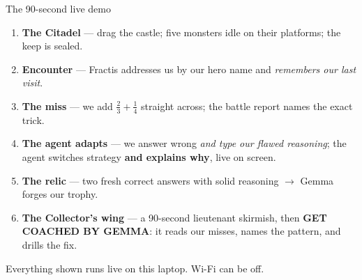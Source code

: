 \documentclass[aspectratio=169,11pt]{beamer}
\newcommand{\mutedtext}[1]{{\color{muted}#1}}
\begin{document}
\begin{frame}{The 90-second live demo}
  \begin{enumerate}\setlength\itemsep{0.4em}
    \item {\small \textbf{The Citadel} --- drag the castle; five monsters idle on their platforms; the keep is sealed.}
    \item {\small \textbf{Encounter} --- Fractis addresses us by our hero name and \emph{remembers our last visit}.}
    \item {\small \textbf{The miss} --- we add $\tfrac{2}{3}+\tfrac{1}{4}$ straight across; the battle report names the exact trick.}
    \item {\small \textbf{The agent adapts} --- we answer wrong \emph{and type our flawed reasoning}; the agent switches strategy \textbf{and explains why}, live on screen.}
    \item {\small \textbf{The relic} --- two fresh correct answers with solid reasoning $\rightarrow$ Gemma forges our trophy.}
    \item {\small \textbf{The Collector's wing} --- a 90-second lieutenant skirmish, then \textbf{GET COACHED BY GEMMA}: it reads our misses, names the pattern, and drills the fix.}
  \end{enumerate}
  \vspace{0.25em}
  \mutedtext{\small Everything shown runs live on this laptop. Wi-Fi can be off.}
\end{frame}
\end{document}

